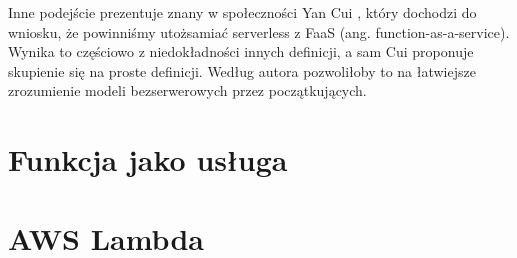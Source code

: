 Inne podejście prezentuje znany w społeczności Yan Cui \cite{cui2024serverless}, który dochodzi do wniosku, że powinniśmy utożsamiać serverless z FaaS (ang. function-as-a-service).
Wynika to częściowo z niedokładności innych definicji, a sam Cui proponuje skupienie się na proste definicji.
Według autora pozwoliłoby to na łatwiejsze zrozumienie modeli bezserwerowych przez początkujących.




\section{Funkcja jako usługa}\label{chapter:funkcja_jako_usluga}

\section{AWS Lambda}\label{chapter:aws_lambda}

